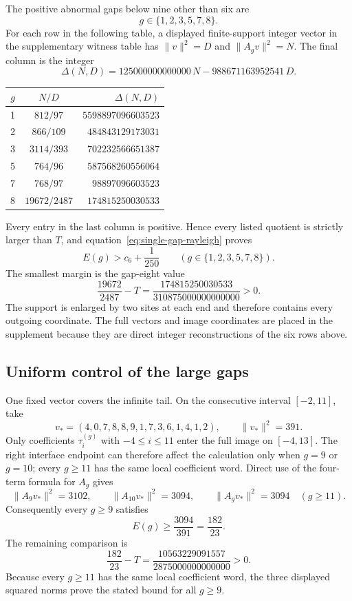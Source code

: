 The positive abnormal gaps below nine other than six are
\[
g\in\{1,2,3,5,7,8\}.
\]
For each row in the following table, a displayed finite-support integer
vector in the supplementary witness table has
\(\|v\|^2=D\) and \(\|A_gv\|^2=N\). The final column is the integer
\[
\Delta(N,D)
=125000000000000\,N-988671163952541\,D.
\]
\begin{center}
\begin{tabular}{c@{\qquad}c@{\qquad}r}
\toprule
\(g\)&\(N/D\)&\(\Delta(N,D)\)\\
\midrule
1&\(812/97\)&\(5598897096603523\)\\
2&\(866/109\)&\(484843129173031\)\\
3&\(3114/393\)&\(702232566651387\)\\
5&\(764/96\)&\(587568260556064\)\\
7&\(768/97\)&\(98897096603523\)\\
8&\(19672/2487\)&\(174815250030533\)\\
\bottomrule
\end{tabular}
\end{center}
Every entry in the last column is positive.  Hence every listed quotient
is strictly larger than \(T\), and
equation~\eqref{eq:single-gap-rayleigh} proves
\[
E(g)>c_6+\frac1{250}
\qquad(g\in\{1,2,3,5,7,8\}).
\]
The smallest margin is the gap-eight value
\[
\frac{19672}{2487}-T
=\frac{174815250030533}{310875000000000000}>0.
\]
The support is enlarged by two sites at each end and therefore contains
every outgoing coordinate. The full vectors and image
coordinates are placed in the supplement because they are direct integer
reconstructions of the six rows above.

\subsection{Uniform control of the large gaps}
\label{subsec:uniform-large-gap-control}

One fixed vector covers the infinite tail.  On the consecutive interval
\([-2,11]\), take
\[
v_*=(4,0,7,8,8,9,1,7,3,6,1,4,1,2),
\qquad \|v_*\|^2=391.
\]
Only coefficients \(\tau_i^{(g)}\) with \(-4\leq i\leq11\) enter the full
image on \([-4,13]\).  The right interface endpoint can therefore affect
the calculation only when \(g=9\) or \(g=10\); every \(g\geq11\) has the
same local coefficient word.  Direct use of the four-term formula for
\(A_g\) gives
\[
\|A_9v_*\|^2=3102,\qquad
\|A_{10}v_*\|^2=3094,\qquad
\|A_gv_*\|^2=3094\quad(g\geq11).
\]
Consequently every \(g\geq9\) satisfies
\[
E(g)\geq\frac{3094}{391}=\frac{182}{23}.
\]
The remaining comparison is
\[
\frac{182}{23}-T
=\frac{10563229091557}{2875000000000000}>0.
\]
Because every \(g\geq11\) has the same local coefficient word, the three
displayed squared norms prove the stated bound for all \(g\geq9\).

